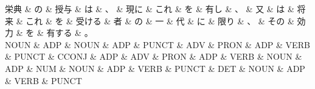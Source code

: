 \documentclass[tikz,border=5pt]{standalone}
\begin{document}
\normalsize
\begin{dependency}[edge unit distance=10.4pt]
    \begin{deptext}[column sep=1em]
        栄典 \& の \& 授与 \& は \& 、 \& 現に \& これ \& を \& 有し \& 、 \& 又 \& は \& 将来 \& これ \& を \& 受ける \& 者 \& の \& 一 \& 代 \& に \& 限り \& 、 \& その \& 効力 \& を \& 有する \& 。\\
        NOUN \& ADP \& NOUN \& ADP \& PUNCT \& ADV \& PRON \& ADP \& VERB \& PUNCT \& CCONJ \& ADP \& ADV \& PRON \& ADP \& VERB \& NOUN \& ADP \& NUM \& NOUN \& ADP \& VERB \& PUNCT \& DET \& NOUN \& ADP \& VERB \& PUNCT\\
    \end{deptext}
\end{dependency}
\end{document}

